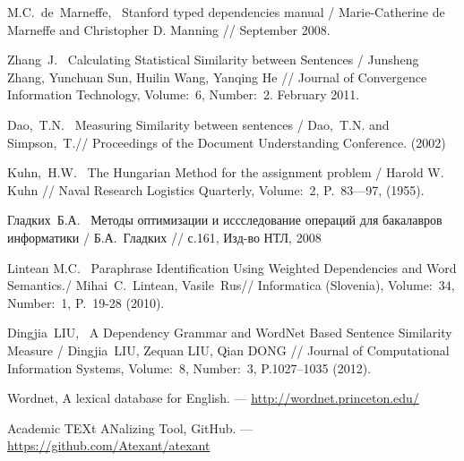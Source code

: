 M.C.~de~Marneffe,~
Stanford typed dependencies manual /
Marie-Catherine de Marneffe and Christopher D. Manning //
September 2008.

Zhang~J.~
Calculating Statistical Similarity between Sentences /
Junsheng Zhang, Yunchuan Sun, Huilin Wang, Yanqing He //
Journal of Convergence Information Technology,
Volume:~6, Number:~2. February 2011.

Dao,~T.N.~
Measuring Similarity between sentences /
Dao,~T.N. and Simpson,~T.//
Proceedings of the Document Understanding Conference. (2002)

Kuhn,~H.W.~
The Hungarian Method for the assignment problem /
Harold W. Kuhn // 
Naval Research Logistics Quarterly,
Volume:~2, P.~83—97, (1955).

Гладких~Б.А.~
Методы оптимизации и иссследование операций для бакалавров информатики /
Б.А.~Гладких //
с.161, Изд-во НТЛ, 2008

Lintean M.C.~
Paraphrase Identification Using Weighted Dependencies and Word Semantics./
Mihai~C.~Lintean, Vasile~Rus//
Informatica (Slovenia),
Volume:~34, Number:~1, P.~19-28 (2010).

Dingjia~LIU,~
A Dependency Grammar and WordNet Based Sentence Similarity Measure /
Dingjia~LIU, Zequan LIU, Qian DONG //
Journal of Computational Information Systems, 
Volume:~8, Number:~3, P.1027–1035 (2012).

Wordnet, A lexical database for English. ---
\url{http://wordnet.princeton.edu/}

Academic TEXt ANalizing Tool, GitHub. ---~
\url{https://github.com/Atexant/atexant}
